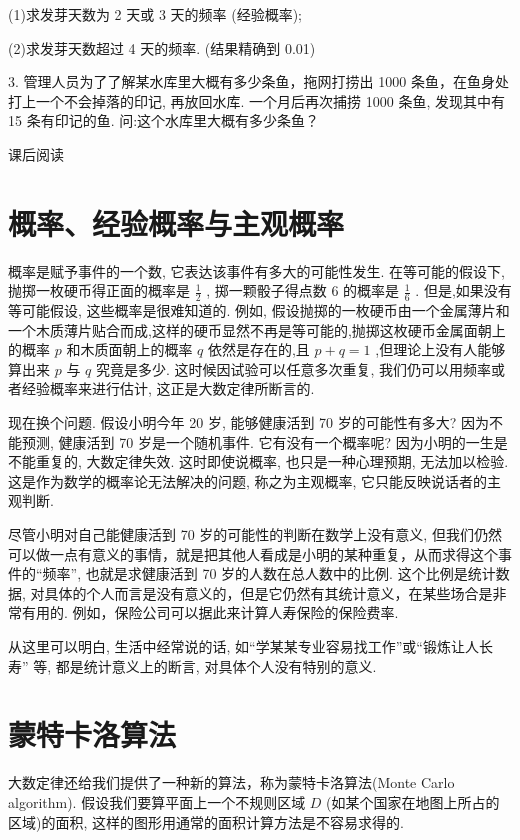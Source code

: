 \documentclass[10pt]{article}
\begin{document}
(1)求发芽天数为 2 天或 3 天的频率 (经验概率);

(2)求发芽天数超过 4 天的频率. (结果精确到 0.01)

3. 管理人员为了了解某水库里大概有多少条鱼，拖网打捞出 1000 条鱼，在鱼身处打上一个不会掉落的印记, 再放回水库. 一个月后再次捕捞 1000 条鱼, 发现其中有 15 条有印记的鱼. 问:这个水库里大概有多少条鱼？



课后阅读

\section*{概率、经验概率与主观概率}

概率是赋予事件的一个数, 它表达该事件有多大的可能性发生. 在等可能的假设下, 抛掷一枚硬币得正面的概率是 \(\frac{1}{2}\) , 掷一颗骰子得点数 6 的概率是 \(\frac{1}{6}\) . 但是,如果没有等可能假设, 这些概率是很难知道的. 例如, 假设抛掷的一枚硬币由一个金属薄片和一个木质薄片贴合而成,这样的硬币显然不再是等可能的,抛掷这枚硬币金属面朝上的概率 \(p\) 和木质面朝上的概率 \(q\) 依然是存在的,且 \(p + q = 1\) ,但理论上没有人能够算出来 \(p\) 与 \(q\) 究竟是多少. 这时候因试验可以任意多次重复, 我们仍可以用频率或者经验概率来进行估计, 这正是大数定律所断言的.

现在换个问题. 假设小明今年 20 岁, 能够健康活到 70 岁的可能性有多大? 因为不能预测, 健康活到 70 岁是一个随机事件. 它有没有一个概率呢? 因为小明的一生是不能重复的, 大数定律失效. 这时即使说概率, 也只是一种心理预期, 无法加以检验. 这是作为数学的概率论无法解决的问题, 称之为主观概率, 它只能反映说话者的主观判断.

尽管小明对自己能健康活到 70 岁的可能性的判断在数学上没有意义, 但我们仍然可以做一点有意义的事情，就是把其他人看成是小明的某种重复，从而求得这个事件的“频率”, 也就是求健康活到 70 岁的人数在总人数中的比例. 这个比例是统计数据, 对具体的个人而言是没有意义的，但是它仍然有其统计意义，在某些场合是非常有用的. 例如，保险公司可以据此来计算人寿保险的保险费率.

从这里可以明白, 生活中经常说的话, 如“学某某专业容易找工作”或“锻炼让人长寿” 等, 都是统计意义上的断言, 对具体个人没有特别的意义.

\section*{蒙特卡洛算法}

大数定律还给我们提供了一种新的算法，称为蒙特卡洛算法(Monte Carlo algorithm). 假设我们要算平面上一个不规则区域 \(D\) (如某个国家在地图上所占的区域)的面积, 这样的图形用通常的面积计算方法是不容易求得的.
\end{document}
